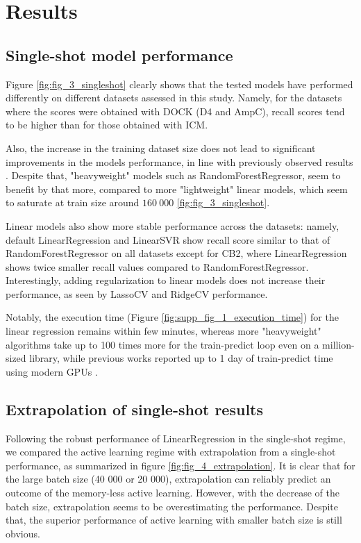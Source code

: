 \section{Results}

\subsection{Single-shot model performance}
\label{subsection:single-shot}

Figure \ref{fig:fig_3_singleshot} clearly shows that the tested models have performed differently on different datasets assessed in this study. Namely, for the datasets where the scores were obtained with DOCK (D4 and AmpC), recall scores tend to be higher than for those obtained with ICM.

Also, the increase in the training dataset size does not lead to significant improvements in the models performance, in line with previously observed results \cite{Yang2021_shoichet_active_learning}. Despite that, "heavyweight" models such as RandomForestRegressor, seem to benefit by that more, compared to more "lightweight" linear models, which seem to saturate at train size around $160\ 000$ \ref{fig:fig_3_singleshot}.

Linear models also show more stable performance across the datasets: namely, default LinearRegression and LinearSVR show recall score similar to that of RandomForestRegressor on all datasets except for CB2, where LinearRegression shows twice smaller recall values compared to RandomForestRegressor. Interestingly, adding regularization to linear models does not increase their performance, as seen by LassoCV and RidgeCV performance.

Notably, the execution time (Figure \ref{fig:supp_fig_1_execution_time}) for the linear regression remains within few minutes, whereas more "heavyweight" algorithms take up to 100 times more for the train-predict loop even on a million-sized library, while previous works reported up to 1 day of train-predict time using modern GPUs \cite{deepdocking}.

\subsection{Extrapolation of single-shot results}
Following the robust performance of LinearRegression in the single-shot regime, we compared the active learning regime with extrapolation from a single-shot performance, as summarized in figure \ref{fig:fig_4_extrapolation}. It is clear that for the large batch size (40 000 or 20 000), extrapolation can reliably predict an outcome of the memory-less active learning. However, with the decrease of the batch size, extrapolation seems to be overestimating the performance. Despite that, the superior performance of active learning with smaller batch size is still obvious.

